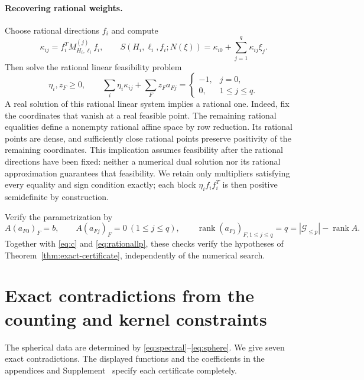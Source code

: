 \documentclass[11pt]{article}
\theoremstyle{remark}
\DeclareMathOperator{\rank}{rank}
\numberwithin{equation}{section}
\begin{document}
\paragraph{Recovering rational weights.}
Choose rational directions $f_i$ and compute
\[
 \kappa_{ij}=f_i^TM_{H_i,\ell_i}^{(j)}f_i,\qquad
 S(H_i,\ell_i,f_i;N(\xi))=\kappa_{i0}+\sum_{j=1}^q\kappa_{ij}\xi_j.
\]
Then solve the rational linear feasibility problem
\begin{equation}\label{eq:rationallp}
 \eta_i,z_F\ge0,\qquad
 \sum_i\eta_i\kappa_{ij}+\sum_Fz_Fa_{Fj}
 =\begin{cases}-1,&j=0,\\0,&1\le j\le q.\end{cases}
\end{equation}
A real solution of this rational linear system implies a rational one.
Indeed, fix the coordinates that vanish at a real feasible point.
The remaining rational equalities define a nonempty rational affine
space by row reduction. Its rational points are dense, and sufficiently
close rational points preserve positivity of the remaining coordinates.
This implication assumes feasibility after the rational directions
have been fixed: neither a numerical dual solution nor its rational
approximation guarantees that feasibility. We retain only multipliers
satisfying every equality and sign condition exactly; each block
$\eta_if_if_i^T$ is then positive semidefinite by construction.

Verify the parametrization by
\begin{equation}\label{eq:affineverify}
 A(a_{F0})_F=b,\qquad A(a_{Fj})_F=0\ (1\le j\le q),\qquad
 \rank(a_{Fj})_{F,1\le j\le q}=q=|\mathcal G_{\le p}|-\rank A.
\end{equation}
Together with \eqref{eq:c} and \eqref{eq:rationallp}, these checks verify
the hypotheses of Theorem~\ref{thm:exact-certificate}, independently
of the numerical search.

\section{Exact contradictions from the counting and kernel constraints}\label{sec:direct}
The spherical data are determined by \eqref{eq:spectral}--\eqref{eq:sphere}.
We give seven exact contradictions. The displayed functions and the
coefficients in the appendices and Supplement~\cite{supp405} specify
each certificate completely.
\end{document}
